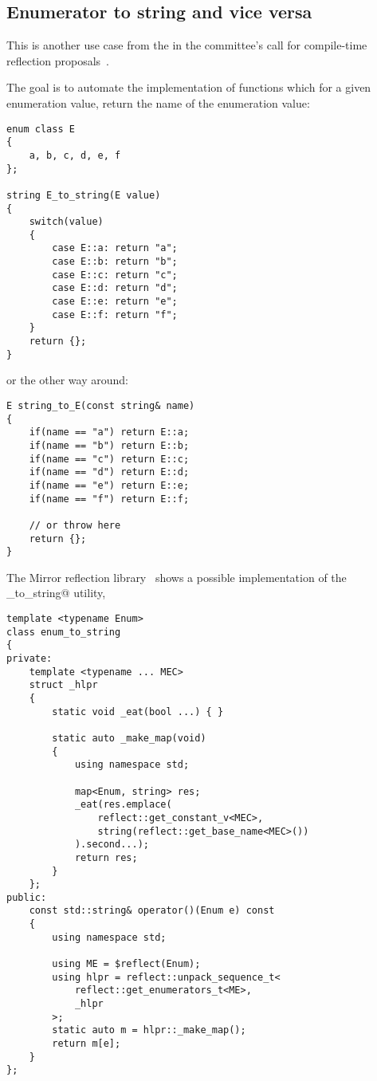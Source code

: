 \subsection{Enumerator to string and vice versa}
\label{use-case-enum-to-string}

This is another use case from the  in the committee's
call for compile-time reflection proposals~\cite{ISOCPP-N3814}. 

The goal is to automate the implementation of functions which for a given
enumeration value, return the name of the enumeration value:

\begin{verbatim}
enum class E
{
	a, b, c, d, e, f
};

string E_to_string(E value)
{
	switch(value)
	{
		case E::a: return "a";
		case E::b: return "b";
		case E::c: return "c";
		case E::d: return "d";
		case E::e: return "e";
		case E::f: return "f";
	}
	return {};
}
\end{verbatim}

or the other way around:

\begin{verbatim}
E string_to_E(const string& name)
{
	if(name == "a") return E::a;
	if(name == "b") return E::b;
	if(name == "c") return E::c;
	if(name == "d") return E::d;
	if(name == "e") return E::e;
	if(name == "f") return E::f;

	// or throw here
	return {};
}
\end{verbatim}

The Mirror reflection library~\cite{Chochlik-Mirror-new-doc} shows a possible
implementation of the \verb@enum_to_string@ utility,

\begin{verbatim}
template <typename Enum>
class enum_to_string
{
private:
	template <typename ... MEC>
	struct _hlpr
	{
		static void _eat(bool ...) { }

		static auto _make_map(void)
		{
			using namespace std;

			map<Enum, string> res;
			_eat(res.emplace(
				reflect::get_constant_v<MEC>,
				string(reflect::get_base_name<MEC>())
			).second...);
			return res;
		}
	};
public:
	const std::string& operator()(Enum e) const
	{
		using namespace std;

		using ME = $reflect(Enum);
		using hlpr = reflect::unpack_sequence_t<
			reflect::get_enumerators_t<ME>,
			_hlpr
		>;
		static auto m = hlpr::_make_map();
		return m[e];
	}
};
\end{verbatim}

